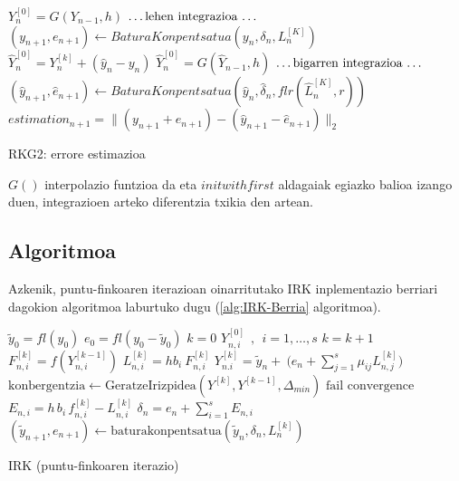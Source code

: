 \begin{algorithm}[h]
  \BlankLine
  {
    \BlankLine
    $Y_n^{[0]}=G(Y_{n-1},h)$\;
    \BlankLine
    $\text{\dots lehen integrazioa \dots}$\;
	\BlankLine
    $(y_{n+1},e_{n+1})\leftarrow BaturaKonpentsatua(y_n,\delta_n,L_n^{[K]})$\;      
    \BlankLine
    \BlankLine
    {$\hat{Y}_{n}^{[0]}=Y_{n}^{[k]}+(\hat{y}_n-y_n)$\;}
    {$\hat{Y}_{n}^{[0]}=G(\hat{Y}_{n-1},h)$\;}
    \BlankLine
    $\text{\dots bigarren integrazioa \dots}$\;
	\BlankLine
    $(\hat{y}_{n+1},\hat{e}_{n+1})\leftarrow BaturaKonpentsatua(\hat{y}_n,\hat{\delta}_n,flr(\hat{L}_n^{[K]},r))$\;  
    \BlankLine
    \BlankLine
    $estimation_{n+1}=\|(y_{n+1}+e_{n+1})-(\hat{y}_{n+1}-\hat{e}_{n+1})\|_2$\;
    \BlankLine
   }
 \caption{RKG2: errore estimazioa}
 \label{alg:errore-estimazioa}
\end{algorithm}

$G()$ interpolazio funtzioa da eta $initwithfirst$ aldagaiak egiazko balioa izango duen, integrazioen arteko diferentzia txikia den artean.

\subsection{Algoritmoa}

Azkenik, puntu-finkoaren iterazioan oinarritutako IRK inplementazio berriari dagokion algoritmoa laburtuko dugu (\ref{alg:IRK-Berria} algoritmoa).

\begin{algorithm}[H]
 \BlankLine
  $\tilde{y}_0=fl(y_0)$\;
  $e_0=fl(y_0-\tilde{y}_0)$\;
  {
   \BlankLine
   $k=0$\;
     $Y_{n,i}^{[0]} \ \ , \ \ i=1,\dots,s $\;
   \BlankLine
   {
    \BlankLine 
    $k=k+1$\;
    $F_{n,i}^{[k]}=f(Y_{n,i}^{[k-1]}) $\;
    $L_{n,i}^{[k]}=hb_i \ F_{n,i}^{[k]} $\;
    $Y_{n.i}^{[k]}=\tilde{y}_{n} + \ \big(e_n+\sum\limits_{j=1}^{s} \mu_{ij} L_{n,j}^{[k]}\big)  $\;  
    $\text{konbergentzia} \leftarrow \text{GeratzeIrizpidea}(Y^{[k]},Y^{[k-1]},\Delta_{min}) $\;
   }
   \BlankLine
   {
   {$\text{fail convergence}$\;}
   }
   $E_{n,i} = h\,   b_i\,f_{n,i}^{[k]}-L_{n,i}^{[k]}$\;
   $\delta_{n}=e_{n}+\sum_{i=1}^{s} E_{n,i}$\;
   $(\tilde y_{n+1}, e_{n+1})\leftarrow \text{baturakonpentsatua}(\tilde y_{n},\delta_{n},L_{n}^{[k]})$\;
   \BlankLine
 }
 \caption{IRK (puntu-finkoaren iterazio)}
 \label{alg:IRK-Berria}
\end{algorithm}

